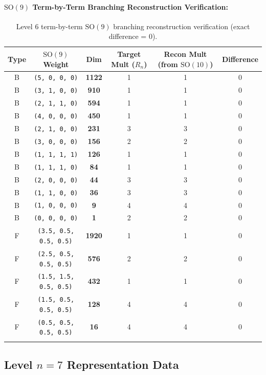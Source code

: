 \documentclass[11pt,a4paper]{article}
\begin{document}
\paragraph{$\mathrm{SO}(9)$ Term-by-Term Branching Reconstruction Verification:}
\begin{longtable}{@{}cccccc@{}}
\toprule
Type & $\mathrm{SO}(9)$ Weight & Dim & Target Mult ($R_n$) & Recon Mult (from $\mathrm{SO}(10)$) & Difference \\
\midrule
\endhead
B & \texttt{(5, 0, 0, 0)} & \textbf{1122} & 1 & 1 & 0 \\
B & \texttt{(3, 1, 0, 0)} & \textbf{910} & 1 & 1 & 0 \\
B & \texttt{(2, 1, 1, 0)} & \textbf{594} & 1 & 1 & 0 \\
B & \texttt{(4, 0, 0, 0)} & \textbf{450} & 1 & 1 & 0 \\
B & \texttt{(2, 1, 0, 0)} & \textbf{231} & 3 & 3 & 0 \\
B & \texttt{(3, 0, 0, 0)} & \textbf{156} & 2 & 2 & 0 \\
B & \texttt{(1, 1, 1, 1)} & \textbf{126} & 1 & 1 & 0 \\
B & \texttt{(1, 1, 1, 0)} & \textbf{84} & 1 & 1 & 0 \\
B & \texttt{(2, 0, 0, 0)} & \textbf{44} & 3 & 3 & 0 \\
B & \texttt{(1, 1, 0, 0)} & \textbf{36} & 3 & 3 & 0 \\
B & \texttt{(1, 0, 0, 0)} & \textbf{9} & 4 & 4 & 0 \\
B & \texttt{(0, 0, 0, 0)} & \textbf{1} & 2 & 2 & 0 \\
F & \texttt{(3.5, 0.5, 0.5, 0.5)} & \textbf{1920} & 1 & 1 & 0 \\
F & \texttt{(2.5, 0.5, 0.5, 0.5)} & \textbf{576} & 2 & 2 & 0 \\
F & \texttt{(1.5, 1.5, 0.5, 0.5)} & \textbf{432} & 1 & 1 & 0 \\
F & \texttt{(1.5, 0.5, 0.5, 0.5)} & \textbf{128} & 4 & 4 & 0 \\
F & \texttt{(0.5, 0.5, 0.5, 0.5)} & \textbf{16} & 4 & 4 & 0 \\
\bottomrule
\caption{Level 6 term-by-term $\mathrm{SO}(9)$ branching reconstruction verification (exact difference = 0).}
\end{longtable}

\subsection{Level $n = 7$ Representation Data}
\end{document}
